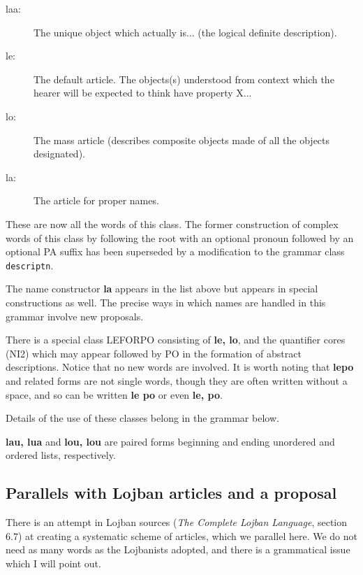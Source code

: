 \documentclass[12pt]{book}
\begin{document}
{\begin{description}
\item[laa:]  The unique object which actually is... (the logical definite description).

 \item[le:]   The default article.  The objects(s) understood from context which the hearer will be expected to think have property X...

\item[lo:]  The mass article (describes composite objects made of all the objects designated).

\item[la:]   The article for proper names.
\end{description}


These are now all the words of this class.  The former construction of complex words of this class
by following the root with an optional pronoun followed by an optional PA suffix has been superseded by a modification to the grammar class {\tt descriptn}.

The name constructor {\bf la} appears in the list above but appears in special constructions as well.   The precise ways in which names are handled in this grammar involve new proposals.

There is a special class LEFORPO consisting of {\bf le, lo}, and the quantifier cores (NI2) which may appear
followed by PO in the formation of abstract descriptions.   Notice that no new words are involved.  It is worth noting that {\bf lepo} and related forms are
not single words, though they are often written without a space, and so can be written {\bf le po} or even {\bf le, po}.

Details of the use of these classes belong in the grammar below.

{\bf lau, lua} and {\bf lou, lou} are paired forms beginning and ending unordered and ordered lists, respectively. 

\subsection{Parallels with Lojban articles and a proposal}

There is an attempt in Lojban sources ({\em The Complete Lojban Language\/}, section 6.7)  at creating a systematic scheme of articles, which we parallel here.  We do not need as many words as the Lojbanists adopted, and there is a grammatical issue which I will point out.

}
\end{document}
